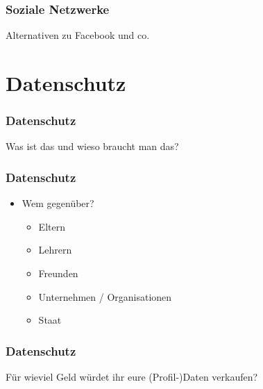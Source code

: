 \documentclass[12pt]{beamer}
\begin{document}
\begin{frame}
  \frametitle{Soziale Netzwerke}

  \begin{center} \Large
   Alternativen zu Facebook und co. 
  \end{center}
\end{frame}

\section{Datenschutz}

\begin{frame}
  \frametitle{Datenschutz}

  \begin{center} \Large
   Was ist das und wieso braucht man das? 
  \end{center}
\end{frame}

\begin{frame}
  \frametitle{Datenschutz}

  \begin{itemize}
    \item Wem gegenüber?
      \begin{itemize}
        \item<2-> Eltern
        \item<3-> Lehrern
        \item<4-> Freunden
        \item<5-> Unternehmen / Organisationen
        \item<6-> Staat
      \end{itemize}
  \end{itemize}
\end{frame}

\begin{frame}
  \frametitle{Datenschutz}

  \begin{center} \Large
   Für wieviel Geld würdet ihr eure (Profil-)Daten verkaufen?
  \end{center}
\end{frame}
\end{document}
